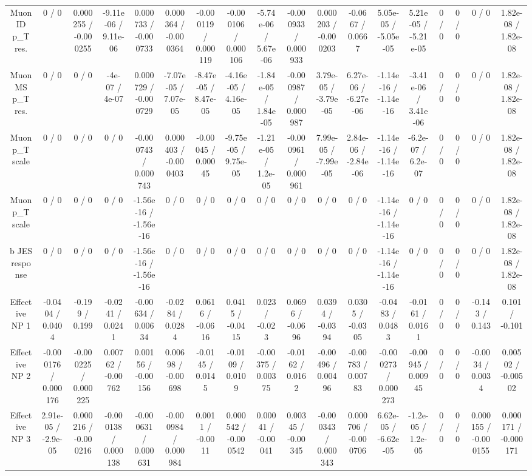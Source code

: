 \documentclass[10pt]{article}
\begin{document}
\begin{table}[htbp]
\begin{center}
\begin{tabular}{|c|c|c|c|c|c|c|c|c|c|c|c|c|c|c|c|c|c|}
  Muon ID p_{T} res. & 0 / 0 & 0.000255 / -0.000255 & -9.11e-06 / 9.11e-06 & 0.000733 / -0.000733 & 0.000364 / -0.000364 & -0.000119 / 0.000119 & -0.000106 / 0.000106 & -5.74e-06 / 5.67e-06 & -0.000933 / 0.000933 & 0.000203 / -0.000203 & -0.0667 / 0.0667 & 5.05e-05 / -5.05e-05 & 5.21e-05 / -5.21e-05 & 0 / 0 & 0 / 0 & 0 / 0 & 1.82e-08 / 1.82e-08 \\ 
  Muon MS p_{T} res. & 0 / 0 & 0 / 0 & -4e-07 / 4e-07 & 0.000729 / -0.000729 & -7.07e-05 / 7.07e-05 & -8.47e-05 / 8.47e-05 & -4.16e-05 / 4.16e-05 & -1.84e-05 / 1.84e-05 & -0.000987 / 0.000987 & 3.79e-05 / -3.79e-05 & 6.27e-06 / -6.27e-06 & -1.14e-16 / -1.14e-16 & -3.41e-06 / 3.41e-06 & 0 / 0 & 0 / 0 & 0 / 0 & 1.82e-08 / 1.82e-08 \\ 
  Muon p_{T} scale & 0 / 0 & 0 / 0 & 0 / 0 & -0.000743 / 0.000743 & 0.000403 / -0.000403 & -0.00045 / 0.00045 & -9.75e-05 / 9.75e-05 & -1.21e-05 / 1.2e-05 & -0.000961 / 0.000961 & 7.99e-05 / -7.99e-05 & 2.84e-06 / -2.84e-06 & -1.14e-16 / -1.14e-16 & -6.2e-07 / 6.2e-07 & 0 / 0 & 0 / 0 & 0 / 0 & 1.82e-08 / 1.82e-08 \\ 
  Muon p_{T} scale & 0 / 0 & 0 / 0 & 0 / 0 & -1.56e-16 / -1.56e-16 & 0 / 0 & 0 / 0 & 0 / 0 & 0 / 0 & 0 / 0 & 0 / 0 & 0 / 0 & -1.14e-16 / -1.14e-16 & 0 / 0 & 0 / 0 & 0 / 0 & 0 / 0 & 1.82e-08 / 1.82e-08 \\ 
  b JES response & 0 / 0 & 0 / 0 & 0 / 0 & -1.56e-16 / -1.56e-16 & 0 / 0 & 0 / 0 & 0 / 0 & 0 / 0 & 0 / 0 & 0 / 0 & 0 / 0 & -1.14e-16 / -1.14e-16 & 0 / 0 & 0 / 0 & 0 / 0 & 0 / 0 & 1.82e-08 / 1.82e-08 \\ 
  Effective NP 1 & -0.0404 / 0.0404 & -0.199 / 0.199 & -0.0241 / 0.0241 & -0.00634 / 0.00634 & -0.0284 / 0.0284 & 0.0616 / -0.0616 & 0.0415 / -0.0415 & 0.023 / -0.023 & 0.0696 / -0.0696 & 0.0394 / -0.0394 & 0.0305 / -0.0305 & -0.0483 / 0.0483 & -0.0161 / 0.0161 & 0 / 0 & 0 / 0 & -0.143 / 0.143 & 0.101 / -0.101 \\ 
  Effective NP 2 & -0.000176 / 0.000176 & -0.000225 / 0.000225 & 0.00762 / -0.00762 & 0.00156 / -0.00156 & 0.00698 / -0.00698 & -0.0145 / 0.0145 & -0.0109 / 0.0109 & -0.00375 / 0.00375 & -0.0162 / 0.0162 & -0.00496 / 0.00496 & -0.00783 / 0.00783 & -0.000273 / 0.000273 & -0.00945 / 0.00945 & 0 / 0 & 0 / 0 & -0.0034 / 0.0034 & 0.00502 / -0.00502 \\ 
  Effective NP 3 & 2.91e-05 / -2.9e-05 & 0.000216 / -0.000216 & -0.000138 / 0.000138 & -0.000631 / 0.000631 & -0.000984 / 0.000984 & 0.0011 / -0.0011 & 0.000542 / -0.000542 & 0.00041 / -0.00041 & 0.00345 / -0.00345 & -0.000343 / 0.000343 & 0.000706 / -0.000706 & 6.62e-05 / -6.62e-05 & -1.2e-05 / 1.2e-05 & 0 / 0 & 0 / 0 & 0.000155 / -0.000155 & 0.000171 / -0.000171 \\ 

\end{tabular}
\end{center}
\end{table}
\end{document}
